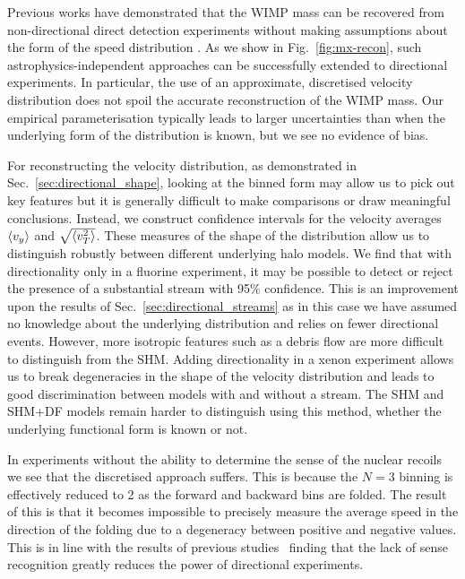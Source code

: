 Previous works have demonstrated that the WIMP mass can be recovered from non-directional direct detection experiments without making assumptions about the form of the speed distribution \cite{Peter:2011eu,Kavanagh:2013wba}. As we show in Fig.~\ref{fig:mx-recon}, such astrophysics-independent approaches can be successfully extended to directional experiments. In particular, the use of an approximate, discretised velocity distribution does not spoil the accurate reconstruction of the WIMP mass. Our empirical parameterisation typically leads to larger uncertainties than when the underlying form of the distribution is known, but we see no evidence of bias.

For reconstructing the velocity distribution, as demonstrated in Sec.~\ref{sec:directional_shape}, looking at the binned form may allow us to pick out key features but it is generally difficult to make comparisons or draw meaningful conclusions. Instead, we construct confidence intervals for the velocity averages $\langle v_y \rangle$ and $\sqrt{\langle v_T^2 \rangle}$. These measures of the shape of the distribution allow us to distinguish robustly between different underlying halo models. We find that with directionality only in a fluorine experiment, it may be possible to detect or reject the presence of a substantial stream with 95\% confidence. This is an improvement upon the results of Sec.~\ref{sec:directional_streams} as in this case we have assumed no knowledge about the underlying distribution and relies on fewer directional events. However, more isotropic features such as a debris flow are more difficult to distinguish from the SHM. Adding directionality in a xenon experiment allows us to break degeneracies in the shape of the velocity distribution and leads to good discrimination between models with and without a stream. The SHM and SHM+DF models remain harder to distinguish using this method, whether the underlying functional form is known or not.

In experiments without the ability to determine the sense of the nuclear recoils we see that the discretised approach suffers. This is because the $N=3$ binning is effectively reduced to 2 as the forward and backward bins are folded. The result of this is that it becomes impossible to precisely measure the average speed in the direction of the folding due to a degeneracy between positive and negative values. This is in line with the results of previous studies~\cite{Green:2007at,Billard:2014ewa} finding that the lack of sense recognition greatly reduces the power of directional experiments.

